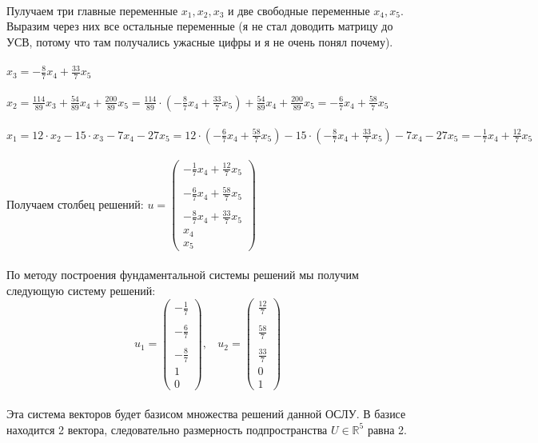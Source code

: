 \documentclass[a4paper, 12pt]{article}
\begin{document}
    \\ Пулучаем три главные переменные $x_1, x_2, x_3$ и две свободные переменные $x_4, x_5$. Выразим через них все остальные переменные (я не стал доводить матрицу до УСВ, потому что там получались ужасные цифры и я не очень понял почему).
    \\
    \\ $x_3 = -\frac{8}{7}x_4 + \frac{33}{7}x_5$
    \\
    \\ $x_2 = \frac{114}{89}x_3 + \frac{54}{89}x_4 + \frac{200}{89}x_5 = \frac{114}{89} \cdot (-\frac{8}{7}x_4 + \frac{33}{7}x_5) + \frac{54}{89}x_4 + \frac{200}{89}x_5 = - \frac{6 }{7}x_4 + \frac{58 }{7}x_5$
    \\
    \\ $x_1 = 12 \cdot x_2 - 15 \cdot x_3 - 7x_4 - 27x_5 = 12 \cdot (- \frac{6 }{7}x_4 + \frac{58 }{7}x_5) - 15 \cdot (-\frac{8}{7}x_4 + \frac{33}{7}x_5) - 7x_4 - 27x_5 = - \frac{1}{7}x_4 + \frac{12 }{7}x_5$
    \\
    \\ Получаем столбец решений: $u = \begin{pmatrix}- \frac{1}{7}x_4 + \frac{12 }{7}x_5 \\\\ - \frac{6 }{7}x_4 + \frac{58 }{7}x_5 \\\\ -\frac{8}{7}x_4 + \frac{33}{7}x_5 \\ x_4 \\ x_5\end{pmatrix}$
    \\
    \\ По методу построения фундаментальной системы решений мы получим следующую систему решений:
    \\
    \[ 
        u_1 = \begin{pmatrix}-\frac{1}{7} \\\\ -\frac{6}{7} \\\\ -\frac{8}{7} \\ 1 \\ 0\end{pmatrix}, \ \ \ \ u_2 = \begin{pmatrix}\frac{12}{7} \\\\ \frac{58}{7} \\\\ \frac{33}{7} \\ 0 \\ 1\end{pmatrix}
    \]
    \\ Эта система векторов будет базисом множества решений данной ОСЛУ. В базисе находится 2 вектора, следовательно размерность подпространства $U \in \mathbb{R}^5$ равна 2.
\end{document}
